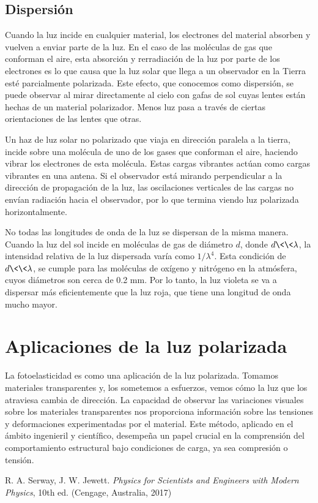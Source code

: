 \documentclass[a4paper,12pt]{article}
\begin{document}
    \subsection*{Dispersión}

        Cuando la luz incide en cualquier material, los electrones del material absorben y vuelven a enviar parte de la luz. En el caso de las moléculas de gas que conforman el aire, esta absorción y rerradiación de la luz por parte de los electrones es lo que causa que la luz solar que llega a un observador en la Tierra esté parcialmente polarizada. Este efecto, que conocemos como dispersión, se puede observar al mirar directamente al cielo con gafas de sol cuyas lentes están hechas de un material polarizador. Menos luz pasa a través de ciertas orientaciones de las lentes que otras.

        Un haz de luz solar no polarizado que viaja en dirección paralela a la tierra, incide sobre una molécula de uno de los gases que conforman el aire, haciendo vibrar los electrones de esta molécula. Estas cargas vibrantes actúan como cargas vibrantes en una antena. Si el observador está mirando perpendicular a la dirección de propagación de la luz, las oscilaciones verticales de las cargas no envían radiación hacia el observador, por lo que termina viendo luz polarizada horizontalmente.

        No todas las longitudes de onda de la luz se dispersan de la misma manera. Cuando la luz del sol incide en moléculas de gas de diámetro $d$, donde $d \< \<  \lambda$, la intensidad relativa de la luz dispersada varía como $1/\lambda^4$. Esta condición de $d \< \< \lambda$, se cumple para las moléculas de oxígeno y nitrógeno en la atmósfera, cuyos diámetros son cerca de 0.2 mm. Por lo tanto, la luz violeta se va a dispersar más eficientemente que la luz roja, que tiene una longitud de onda mucho mayor.

\section*{Aplicaciones de la luz polarizada}
    
    La fotoelasticidad es como una aplicación de la luz polarizada. Tomamos materiales transparentes y, los sometemos a esfuerzos, vemos cómo la luz que los atraviesa cambia de dirección. La capacidad de observar las variaciones visuales sobre los materiales transparentes nos proporciona información sobre las tensiones y deformaciones experimentadas por el material. Este método, aplicado en el ámbito ingenieril y científico, desempeña un papel crucial en la comprensión del comportamiento estructural bajo condiciones de carga, ya sea compresión o tensión.


\begin{thebibliography}{99}

\bibitem{} R. A. Serway, J. W. Jewett. \emph{Physics for Scientists and Engineers with Modern Physics}, 10th ed. (Cengage, Australia, 2017)

\end{thebibliography}
\end{document}
